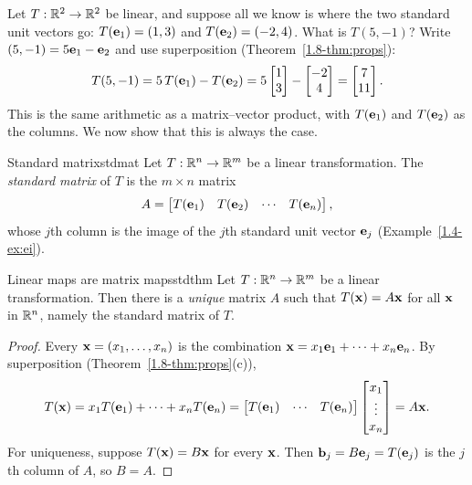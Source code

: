 \documentclass[11pt]{article}
\begin{document}
Let $T:\mathbb{R}^2\to\mathbb{R}^2$ be linear, and suppose all we know is where the two standard unit vectors go: $T(\mathbf{e}_1)=(1,3)$ and $T(\mathbf{e}_2)=(-2,4)$. What is $T(5,-1)$? Write $(5,-1)=5\mathbf{e}_1-\mathbf{e}_2$ and use superposition (Theorem~\ref{1.8-thm:props}):
\[
T(5,-1)=5\,T(\mathbf{e}_1)-T(\mathbf{e}_2)=5\begin{bmatrix}1\\3\end{bmatrix}-\begin{bmatrix}-2\\4\end{bmatrix}=\begin{bmatrix}7\\11\end{bmatrix}.
\]
This is the same arithmetic as a matrix--vector product, with $T(\mathbf{e}_1)$ and $T(\mathbf{e}_2)$ as the columns. We now show that this is always the case.

\begin{defn}{Standard matrix}{stdmat}
Let $T:\mathbb{R}^n\to\mathbb{R}^m$ be a linear transformation. The \emph{standard matrix} of $T$ is the $m\times n$ matrix
\[
A=\begin{bmatrix}T(\mathbf{e}_1)&T(\mathbf{e}_2)&\cdots&T(\mathbf{e}_n)\end{bmatrix},
\]
whose $j$th column is the image of the $j$th standard unit vector $\mathbf{e}_j$ (Example~\ref{1.4-ex:ei}).
\end{defn}

\begin{thm}{Linear maps are matrix maps}{stdthm}
Let $T:\mathbb{R}^n\to\mathbb{R}^m$ be a linear transformation. Then there is a \emph{unique} matrix $A$ such that $T(\mathbf{x})=A\mathbf{x}$ for all $\mathbf{x}$ in $\mathbb{R}^n$, namely the standard matrix of $T$.
\end{thm}

\begin{proof}
Every $\mathbf{x}=(x_1,\dots,x_n)$ is the combination $\mathbf{x}=x_1\mathbf{e}_1+\cdots+x_n\mathbf{e}_n$. By superposition (Theorem~\ref{1.8-thm:props}(c)),
\[
T(\mathbf{x})=x_1T(\mathbf{e}_1)+\cdots+x_nT(\mathbf{e}_n)=\begin{bmatrix}T(\mathbf{e}_1)&\cdots&T(\mathbf{e}_n)\end{bmatrix}\begin{bmatrix}x_1\\\vdots\\x_n\end{bmatrix}=A\mathbf{x}.
\]
For uniqueness, suppose $T(\mathbf{x})=B\mathbf{x}$ for every $\mathbf{x}$. Then $\mathbf{b}_j=B\mathbf{e}_j=T(\mathbf{e}_j)$ is the $j$th column of $A$, so $B=A$.
\end{proof}
\end{document}
